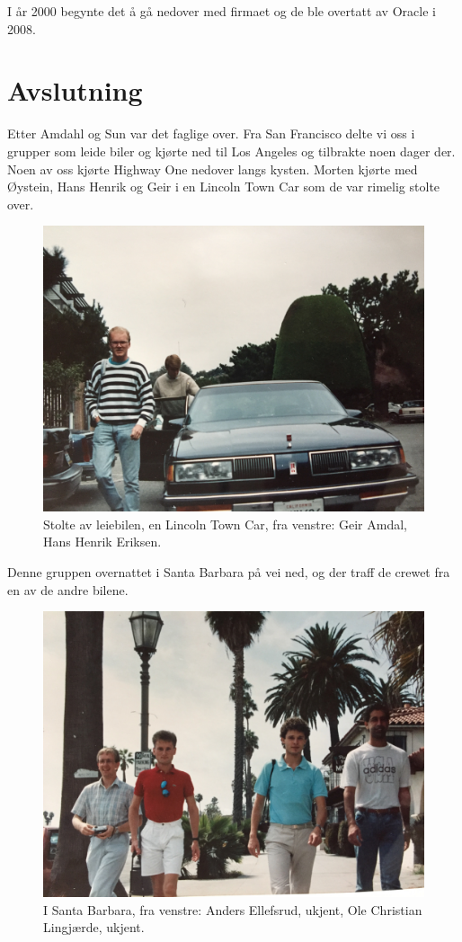 \documentclass[../../main.tex]{subfiles}
\begin{document}
I år 2000 begynte det å gå nedover med firmaet og de ble overtatt av Oracle i 2008.

\section{Avslutning}

Etter Amdahl og Sun var det faglige over. Fra San Francisco delte vi oss i grupper som leide biler og kjørte ned til Los Angeles og tilbrakte noen dager der. Noen av oss kjørte Highway One nedover langs kysten. Morten kjørte med Øystein, Hans Henrik og Geir i en Lincoln Town Car som de var rimelig stolte over. 

\begin{figure}
	\includegraphics[width=\linewidth]{images/usa88/IMG_3848.jpg}
	\caption{Stolte av leiebilen, en Lincoln Town Car, fra venstre: Geir Amdal, Hans Henrik Eriksen.}
\end{figure}

Denne gruppen overnattet i Santa Barbara på vei ned, og der traff de crewet fra en av de andre bilene.

\begin{figure}
	\includegraphics[width=\linewidth]{images/usa88/IMG_3849.jpg}
	\caption{I Santa Barbara, fra venstre: Anders Ellefsrud, ukjent, Ole Christian Lingjærde, ukjent.}
\end{figure}
\end{document}
